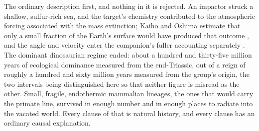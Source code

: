 The ordinary description first, and nothing in it is rejected. An
impactor struck a shallow, sulfur-rich sea, and the target's chemistry
contributed to the atmospheric forcing associated with the mass
extinction; Kaiho and Oshima estimate that
only a small fraction of the Earth's surface would have produced that
outcome \cite{Kaiho2017}, and the angle and velocity enter the
companion's fuller accounting separately \cite{Nexus}. The dominant
dinosaurian regime ended: about a hundred and thirty-five million years
of ecological dominance measured from the end-Triassic, out of a reign
of roughly a hundred and sixty million years measured from the group's
origin, the two intervals being distinguished here so that neither
figure is misread as the other. Small, fragile, endothermic
mammalian lineages, the ones that would carry the primate line, survived
in enough number and in enough places to radiate into the vacated
world. Every clause of that is natural history, and every clause has an
ordinary causal explanation.

